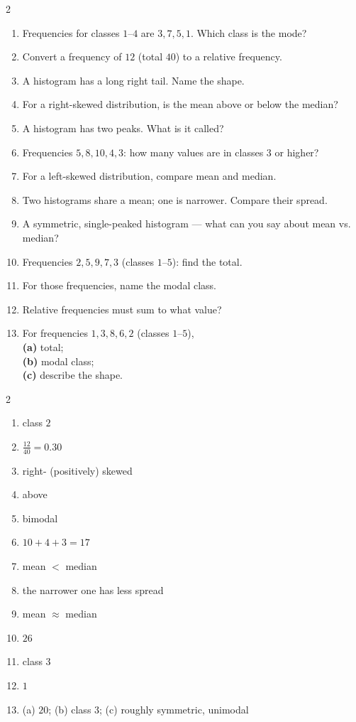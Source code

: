 \documentclass[11pt]{article}
\begin{document}
\clearpage
{}

\begin{recapbox}
\begin{multicols}{2}
\small
\begin{enumerate}[leftmargin=*,itemsep=3pt]
  \item Frequencies for classes $1$--$4$ are $3,7,5,1$. Which class is the mode?
  \item Convert a frequency of $12$ (total $40$) to a relative frequency.
  \item A histogram has a long right tail. Name the shape.
  \item For a right-skewed distribution, is the mean above or below the median?
  \item A histogram has two peaks. What is it called?
  \item Frequencies $5,8,10,4,3$: how many values are in classes $3$ or higher?
  \item For a left-skewed distribution, compare mean and median.
  \item Two histograms share a mean; one is narrower. Compare their spread.
  \item A symmetric, single-peaked histogram --- what can you say about mean vs. median?
  \item Frequencies $2,5,9,7,3$ (classes $1$--$5$): find the total.
  \item For those frequencies, name the modal class.
  \item Relative frequencies must sum to what value?
  \item For frequencies $1,3,8,6,2$ (classes $1$--$5$), \\ \textbf{(a)} total; \\ \textbf{(b)} modal class; \\ \textbf{(c)} describe the shape.
\end{enumerate}
\end{multicols}
\end{recapbox}

\begin{keybox}
\begin{multicols}{2}
\small
\begin{enumerate}[leftmargin=*,itemsep=3pt]
  \item class $2$
  \item $\tfrac{12}{40}=0.30$
  \item right- (positively) skewed
  \item above
  \item bimodal
  \item $10+4+3=17$
  \item mean $<$ median
  \item the narrower one has less spread
  \item mean $\approx$ median
  \item $26$
  \item class $3$
  \item $1$
  \item (a) $20$; (b) class $3$; (c) roughly symmetric, unimodal
\end{enumerate}
\end{multicols}
\end{keybox}
\end{document}
